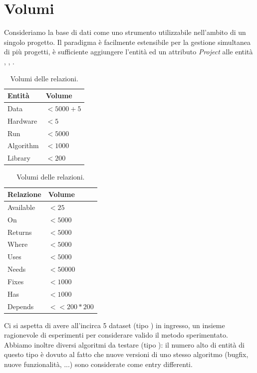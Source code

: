 \documentclass{article}
\begin{document}
\section{Volumi}
Consideriamo la base di dati come uno strumento utilizzabile nell'ambito di un singolo progetto. Il paradigma è facilmente estensibile per la gestione simultanea di più progetti, è sufficiente aggiungere l'entità  ed un attributo \emph{Project} alle entità , , .
\begin{table}[H]
    \begin{minipage}[b]{.5\linewidth}
      \centering
      \begin{tabular}{||l l||}
        \hline
        Entità & Volume \\ [0.5ex]
        \hline\hline
        Data & $<5000 + 5$\\
        Hardware & $<5$\\
        Run & $<5000$\\
        Algorithm & $<1000$\\
        Library & $<200$\\
        \hline
       \end{tabular}
       \caption{Volumi delle entità.}
    \end{minipage}
    \begin{minipage}[b]{.5\linewidth}
      \centering
        \begin{tabular}{||l l||}
            \hline
            Relazione & Volume \\ [0.5ex]
            \hline\hline
            Available & $<25$\\
            On & $<5000$\\
            Returns & $<5000$\\
            Where & $<5000$\\
            Uses & $<5000$\\
            Needs & $<50000$\\
            Fixes & $<1000$\\
            Has & $<1000$\\
            Depends & $<<200*200$\\
            \hline
           \end{tabular}
           \caption{Volumi delle relazioni.}
    \end{minipage}
\end{table}

Ci si aspetta di avere all'incirca 5 dataset (tipo ) in ingresso, un insieme ragionevole di esperimenti per considerare valido il metodo sperimentato. Abbiamo inoltre diversi algoritmi da testare  (tipo ): il numero alto di entità di questo tipo è dovuto al fatto che nuove versioni di uno stesso algoritmo (bugfix, nuove funzionalità, ...) sono considerate come entry differenti.
\end{document}

